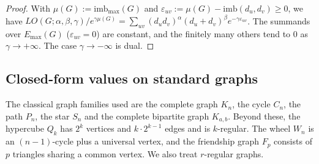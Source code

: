 \documentclass[a5paper, 10pt]{article}
\theoremstyle{plain}
\theoremstyle{remark}
\theoremstyle{definition}
\newcommand{\Wuzi}{LO(G;\alpha,\beta,\gamma)}
\begin{document}
  \begin{proof}
  With
  $\mu(G) := \mathrm{imb}_{\max}(G)$ and
  $\varepsilon_{uv} := \mu(G) - \mathrm{imb}(d_u, d_v) \ge 0$,
  we have $\Wuzi / e^{\gamma \mu(G)} = \sum_{uv} (d_u d_v)^{\alpha}(d_u +
  d_v)^{\beta} e^{-\gamma \varepsilon_{uv}}$. The summands over
  $E_{\max}(G)$ ($\varepsilon_{uv} = 0$) are constant, and the finitely
  many others tend to $0$ as $\gamma \to +\infty$. The case
  $\gamma \to -\infty$ is dual.
  \end{proof}

\subsection{Closed-form values on standard graphs}\label{sec:closedforms}
The classical graph families used are the complete graph $K_n$, the
cycle $C_n$, the path $P_n$, the star $S_n$ and the complete bipartite
graph $K_{a,b}$. Beyond these, the hypercube $Q_k$ has $2^k$ vertices and
$k \cdot 2^{k - 1}$ edges and is $k$-regular. The wheel $W_n$ is an
$(n - 1)$-cycle plus a universal vertex, and the friendship graph $F_p$
consists of $p$ triangles sharing a common vertex. We also treat $r$-regular graphs.
\end{document}
